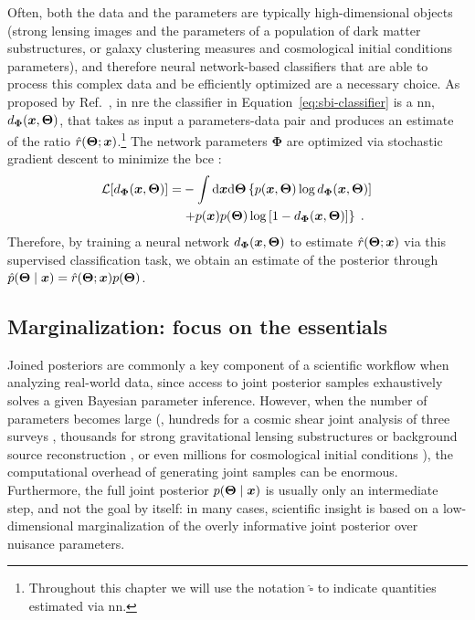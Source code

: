 Often, both the data and the parameters are typically high-dimensional objects (\eg strong lensing images and the parameters of a population of dark matter substructures, or galaxy clustering measures and  cosmological initial conditions parameters), and therefore neural network-based classifiers that are able to process this complex data and be efficiently optimized are a necessary choice.
As proposed by Ref.~\cite{Hermans:2019ioj}, in \gls*{nre} the classifier in Equation~\eqref{eq:sbi-classifier} is a \gls*{nn},  $d_{\bm{\Phi}}(\bm{x}, \bm{\Theta})$, that takes as input a parameters-data pair and produces an estimate of the ratio $\hat{r}(\bm{\Theta};\bm{x})$.\footnote{Throughout this chapter we will use the notation $\hat{\square}$ to indicate quantities estimated via \gls*{nn}.} 
The network parameters ${\bm{\Phi}}$ are optimized via stochastic gradient descent  \cite{Murphy:book, bottou:nips, kingma2014adam} to minimize the \gls*{bce} \cite{mao2023cross}:
\begin{equation}\label{eq:sbi-bce}
\begin{split}
    \mathcal{L}[d_{\bm{\Phi}}(\bm{x}, \bm{\Theta})] = &-\int \dd \bm{x}  \dd\bm{\Theta} \left\{ p(\bm{x}, \bm{\Theta}) \log d_{\bm{\Phi}}(\bm{x}, \bm{\Theta}) ] \right. \\
    & \left. + p(\bm{x}) p(\bm{\Theta}) \log\left[ 1 - d_{\bm{\Phi}}(\bm{x}, \bm{\Theta}) \right] \right\}\; .
\end{split}
\end{equation}
Therefore, by training a neural network $d_{\bm{\Phi}}(\bm{x}, \bm{\Theta})$ to estimate $\hat{r}(\bm{\Theta}; \bm{x})$ via this supervised classification task, we obtain an estimate of the posterior through $\hat{p}(\bm{\Theta} \mid \bm{x}) = \hat{r}(\bm{\Theta}; \bm{x}) p(\bm{\Theta})$. 



\subsection{Marginalization: focus on the essentials} \label{subsec:tmnre-m} %

Joined posteriors are commonly a key component of a scientific workflow when analyzing real-world data, since access to joint posterior samples exhaustively solves a given Bayesian parameter inference. However, when the number of parameters becomes large (\eg, hundreds for a cosmic shear joint analysis of three surveys \cite{Piras:2024dml}, thousands for strong gravitational lensing substructures \cite{Montel:2022fhv, Coogan:2022cky} or background source reconstruction \cite{Karchev:2021fro}, or even millions for cosmological initial conditions \cite{Jasche:2012kq, List:2023aa}), the computational overhead of generating joint samples can be enormous. Furthermore, the full joint posterior $p(\bm{\Theta} \mid \bm{x})$ is usually only an intermediate step, and not the goal by itself: in many cases, scientific insight is based on a low-dimensional marginalization of the overly informative joint posterior over nuisance parameters.

